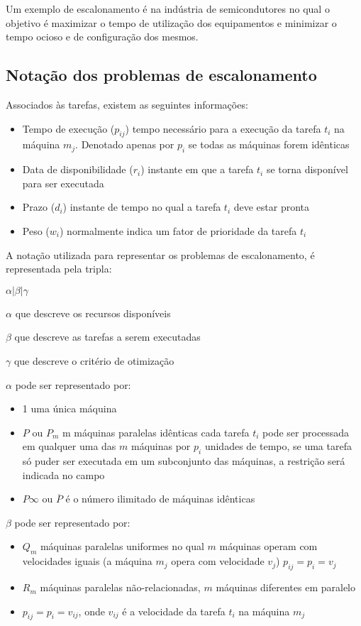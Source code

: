 Um exemplo de escalonamento é na indústria de semicondutores  no qual o objetivo é maximizar o tempo de utilização dos equipamentos e minimizar o tempo ocioso e de configuração dos mesmos.

\subsection{Notação dos problemas de escalonamento}
Associados às tarefas, existem as seguintes informações:
\begin{itemize}
\item Tempo de execução ($p_{ij}$) tempo necessário para a execução da tarefa $t_i$ na máquina $m_j$. Denotado apenas por $p_i$ se todas as máquinas forem idênticas
\item Data de disponibilidade ($r_i$) instante em que a tarefa $t_i$ se torna disponível para ser executada
\item Prazo ($d_i$) instante de tempo no qual a tarefa $t_i$ deve estar pronta
\item Peso ($w_i$) normalmente indica um fator de prioridade da tarefa $t_i$
\end{itemize}

A notação utilizada para representar os problemas de escalonamento, é representada pela tripla:   

$\alpha | \beta | \gamma$

$\alpha$ 	que descreve os recursos disponíveis

$\beta$ que descreve as tarefas a serem executadas

$\gamma$ que descreve o critério de otimização

$\alpha$ pode ser representado por:

\begin{itemize}
\item 1 uma única máquina
\item $P$ ou $P_m$ m máquinas paralelas idênticas cada tarefa $t_i$ pode ser processada em qualquer uma das $m$ máquinas por $p_i$ unidades de tempo, se uma tarefa só puder ser executada em um subconjunto das máquinas, a restrição será indicada no campo 
\item $P \infty$ ou $\overline{P}$ é o número ilimitado de máquinas idênticas
\end{itemize}

$\beta$ pode ser representado por:
\begin{itemize}
\item $Q_m$ máquinas paralelas uniformes no qual $m$ máquinas  operam com 
velocidades iguais (a máquina $m_j$ opera com velocidade $v_j$) $p_{ij} = p_i=v_j$
\item $R_m$ máquinas paralelas não-relacionadas, $m$ máquinas diferentes em paralelo
\item $p_{ij} = p_i=v_{ij}$, onde $v_{ij}$ é a velocidade da tarefa $t_i$ na máquina $m_j$
\end{itemize}

